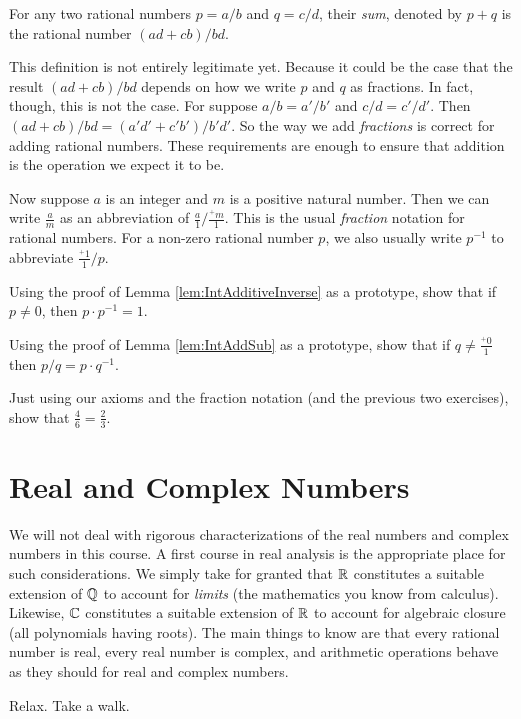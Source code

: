\begin{defn}
For any two rational numbers $p = a/b $ and $q=c/d$, their \emph{sum}, denoted by $p+q$ is the rational number $(ad+cb)/bd$.
\end{defn}

This definition is not entirely legitimate yet. Because it could be the case that the result $(ad+cb)/bd$ depends on how we write $p$ and $q$ as fractions. In fact, though, this is not the case. For suppose $a/b = a'/b'$
and $c/d=c'/d'$. Then $(ad+cb)/bd = (a'd'+c'b')/b'd'$. So the way we add \emph{fractions} is correct for adding rational numbers.
These requirements are enough to ensure that addition is the operation we expect it to be. 

Now suppose $a$ is an integer and $m$ is a positive natural number. Then we
can write $\frac{a}m$ as an abbreviation of $\frac{a}{1} / \frac{{}^+m}1$. This is
the usual \emph{fraction} notation for rational numbers.
For a non-zero rational number $p$, we also usually write $p^{-1}$ to abbreviate 
$\frac{{}^+1}{1}/ p$.

\begin{exer}
\begin{exercise}
\item Using the proof of Lemma \ref{lem:IntAdditiveInverse} as a prototype, show that if $p\neq 0$,
then $p\cdot p^{-1} = 1$. 
\item Using the proof of Lemma \ref{lem:IntAddSub} as a prototype, show that if $q\neq \frac{{}^+0}{1}$ then $p/ q = p\cdot q^{-1}$.
\item Just using our axioms and the fraction notation (and the previous two exercises),
show that $\frac{4}{6} = \frac{2}{3}$.
\end{exercise}
\end{exer}

\section{Real and Complex Numbers}

We will not deal with rigorous characterizations of the real numbers and complex numbers in this course. 
A first course in real analysis is the appropriate place for such considerations. 
We simply take for granted that ${\mathbb R}$ constitutes a suitable
extension of ${\mathbb Q}$ to account for \emph{limits} (the mathematics you know from calculus). Likewise, ${\mathbb C}$
constitutes a suitable extension of ${\mathbb R}$ to account for 
algebraic closure (all polynomials having roots). The main things to know are that every rational number is real,
every real number is complex, and arithmetic operations behave as they should for real and complex numbers.

\begin{exer}
\begin{exercise}
  \item Relax. Take a walk.
\end{exercise}
\end{exer}